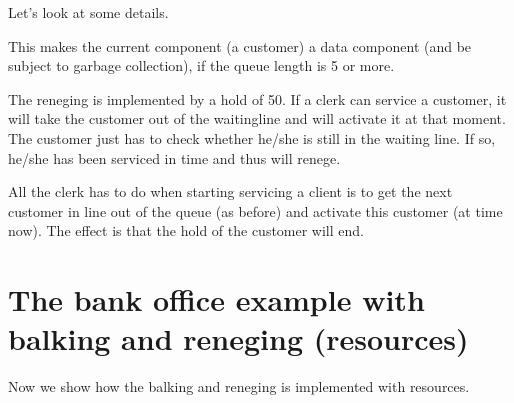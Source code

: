 \documentclass[letterpaper,10pt,english]{sphinxmanual}
\begin{document}
\begin{sphinxVerbatim}[commandchars=\\\{\}]
\end{sphinxVerbatim}

Let’s look at some details.

%
\begin{sphinxVerbatim}[commandchars=\\\{\}]
 
\end{sphinxVerbatim}

This makes the current component (a customer) a data component (and be subject to
garbage collection), if the queue length is 5 or more.

The reneging is implemented by a hold of 50. If a clerk can service a customer, it will take
the customer out of the waitingline and will activate it at that moment. The customer just has to check
whether he/she is still in the waiting line. If so, he/she has been serviced in time and thus will renege.

%
\begin{sphinxVerbatim}[commandchars=\\\{\}]
 
   
      
\end{sphinxVerbatim}

All the clerk has to do when starting servicing a client is to get the next customer in line
out of the queue (as before) and activate this customer (at time now). The effect is that the hold
of the customer will end.

%
\begin{sphinxVerbatim}[commandchars=\\\{\}]
  
\end{sphinxVerbatim}


\section{The bank office example with balking and reneging (resources)}
\label{\detokenize{Modeling:the-bank-office-example-with-balking-and-reneging-resources}}
Now we show how the balking and reneging is implemented with resources.
\end{document}
